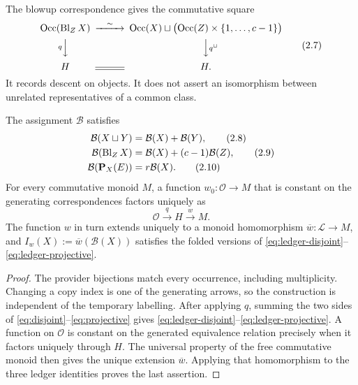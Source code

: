 The blowup correspondence gives the commutative square
\begin{equation}
\begin{CD}
 \Occ(\Bl_ZX) @>{\sim}>>
 \Occ(X)\sqcup\bigl(\Occ(Z)\times\{1,\ldots,c-1\}\bigr)\\
 @V{q}VV @VV{q^{\sqcup}}V\\
 H @= H .
\end{CD}
\tag{2.7}\label{diag:occurrence-descent}
\end{equation}
It records descent on objects.  It does not assert an isomorphism between
unrelated representatives of a common class.

\begin{theorem}
\label{thm:ledger}
The assignment \(\mathcal B\) satisfies
\begin{align}
 \mathcal B(X\sqcup Y)&=\mathcal B(X)+\mathcal B(Y),
                                                        \tag{2.8}\label{eq:ledger-disjoint}\\
 \mathcal B(\operatorname{Bl}_ZX)&=\mathcal B(X)+(c-1)\mathcal B(Z),
                                                        \tag{2.9}\label{eq:ledger-blowup}\\
 \mathcal B(\mathbf P_X(E))&=r\mathcal B(X).                 \tag{2.10}\label{eq:ledger-projective}
\end{align}
For every commutative monoid $M$, a function $w_0:\mathscr O\to M$ that
is constant on the generating correspondences factors uniquely as
\[
 \mathscr O\xrightarrow{q}H\xrightarrow{w}M.
\]
The function $w$ in turn extends uniquely to a monoid homomorphism
\(\overline w:\mathcal L\to M\), and
\(I_w(X):=\overline w(\mathcal B(X))\) satisfies the folded versions of
\eqref{eq:ledger-disjoint}--\eqref{eq:ledger-projective}.
\end{theorem}

\begin{proof}
The provider bijections match every occurrence, including multiplicity.
Changing a copy index is one of the generating arrows, so the construction is
independent of the temporary labelling.  After applying $q$, summing the two sides of
\eqref{eq:disjoint}--\eqref{eq:projective} gives
\eqref{eq:ledger-disjoint}--\eqref{eq:ledger-projective}.  A function on
\(\mathscr O\) is constant on the generated equivalence relation precisely
when it factors uniquely through $H$.  The universal property of the free
commutative monoid then gives the unique extension \(\overline w\).  Applying
that homomorphism to the three ledger identities proves the last assertion.
\end{proof}

